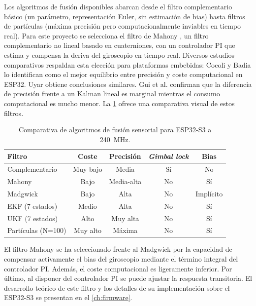 Los algoritmos de fusión disponibles abarcan desde el filtro complementario básico (un parámetro, representación Euler, sin estimación de bias) hasta filtros de partículas (máxima precisión pero computacionalmente inviables en tiempo real). Para este proyecto se selecciona el filtro de Mahony \cite{mahony2008}, un filtro complementario no lineal basado en cuaterniones, con un controlador PI que estima y compensa la deriva del giroscopio en tiempo real. Diversos estudios comparativos respaldan esta elección para plataformas embebidas: Cocoli y Badia \cite{cocoli2023} lo identifican como el mejor equilibrio entre precisión y coste computacional en ESP32. Uyar \cite{uyar2024} obtiene conclusiones similares. Gui et al. \cite{gui2015} confirman que la diferencia de precisión frente a un Kalman lineal es marginal mientras el consumo computacional es mucho menor. La \cref{tab:filtros_comp} ofrece una comparativa visual de estos filtros.

\begin{table}[H]
\centering
\caption{Comparativa de algoritmos de fusión sensorial para ESP32-S3 a \SI{240}{\mega\hertz}.}
\label{tab:filtros_comp}
\small
\begin{tabular}{@{}l c c c c@{}}
\toprule
\textbf{Filtro} & \textbf{Coste} & \textbf{Precisión} & \textbf{\textit{Gimbal lock}} & \textbf{Bias} \\
\midrule
Complementario     & Muy bajo  & Media      & Sí  & No         \\
Mahony             & Bajo      & Media-alta & No  & Sí         \\
Madgwick           & Bajo      & Alta       & No  & Implícito  \\
EKF (7 estados)    & Medio     & Alta       & No  & Sí         \\
UKF (7 estados)    & Alto      & Muy alta   & No  & Sí         \\
Partículas (N=100) & Muy alto  & Máxima     & No  & Sí         \\
\bottomrule
\end{tabular}
\end{table}

El filtro Mahony se ha seleccionado frente al Madgwick por la capacidad de compensar activamente el bias del giroscopio mediante el término integral del controlador PI. Además, el coste computacional es ligeramente inferior. Por último, al disponer del controlador PI se puede ajustar la respuesta transitoria. El desarrollo teórico de este filtro y los detalles de su implementación sobre el ESP32-S3 se presentan en el \cref{ch:firmware}.



